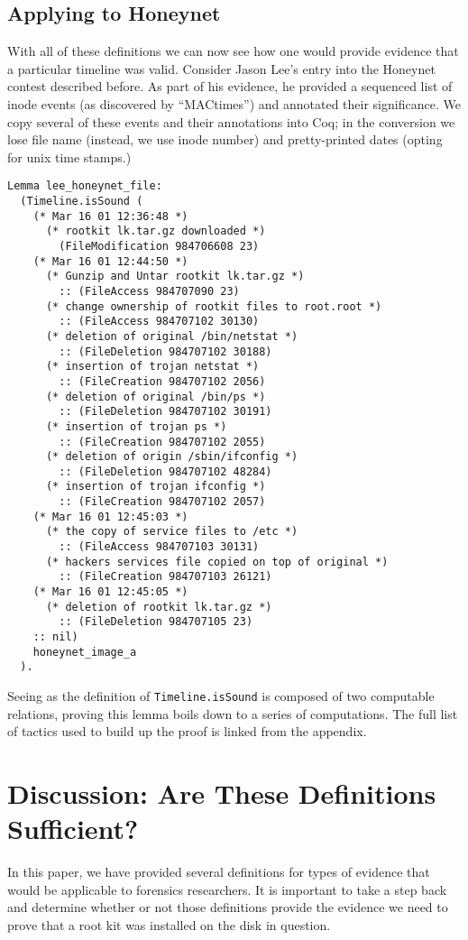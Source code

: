 \documentclass[nocopyrightspace]{sigplanconf}
\begin{document}
\subsection{Applying to Honeynet}
With all of these definitions we can now see how one would provide evidence
that a particular timeline was valid. Consider Jason Lee's entry\cite{lee}
into the Honeynet contest described before. As part of his evidence, he
provided a sequenced list of inode events (as discovered by ``MACtimes'') and
annotated their significance. We copy several of these events and their
annotations into Coq; in the conversion we lose file name (instead, we use
inode number) and pretty-printed dates (opting for unix time stamps.)

\begin{lstlisting}
Lemma lee_honeynet_file:
  (Timeline.isSound (
    (* Mar 16 01 12:36:48 *)
      (* rootkit lk.tar.gz downloaded *)
        (FileModification 984706608 23)
    (* Mar 16 01 12:44:50 *)
      (* Gunzip and Untar rootkit lk.tar.gz *)
        :: (FileAccess 984707090 23)
      (* change ownership of rootkit files to root.root *)
        :: (FileAccess 984707102 30130)
      (* deletion of original /bin/netstat *)
        :: (FileDeletion 984707102 30188)
      (* insertion of trojan netstat *)
        :: (FileCreation 984707102 2056) 
      (* deletion of original /bin/ps *)
        :: (FileDeletion 984707102 30191)
      (* insertion of trojan ps *)
        :: (FileCreation 984707102 2055) 
      (* deletion of origin /sbin/ifconfig *)
        :: (FileDeletion 984707102 48284)
      (* insertion of trojan ifconfig *)
        :: (FileCreation 984707102 2057) 
    (* Mar 16 01 12:45:03 *)
      (* the copy of service files to /etc *)
        :: (FileAccess 984707103 30131)  
      (* hackers services file copied on top of original *)
        :: (FileCreation 984707103 26121)
    (* Mar 16 01 12:45:05 *)
      (* deletion of rootkit lk.tar.gz *)
        :: (FileDeletion 984707105 23)   
    :: nil)
    honeynet_image_a
  ).
\end{lstlisting}

Seeing as the definition of {\tt Timeline.isSound} is composed of two
computable relations, proving this lemma boils down to a series of
computations. The full list of tactics used to build up the proof is linked
from the appendix.

\section{Discussion: Are These Definitions Sufficient?}
In this paper, we have provided several definitions for types of evidence that
would be applicable to forensics researchers. It is important to take a step
back and determine whether or not those definitions provide the evidence we
need to prove that a root kit was installed on the disk in question. 
\end{document}
